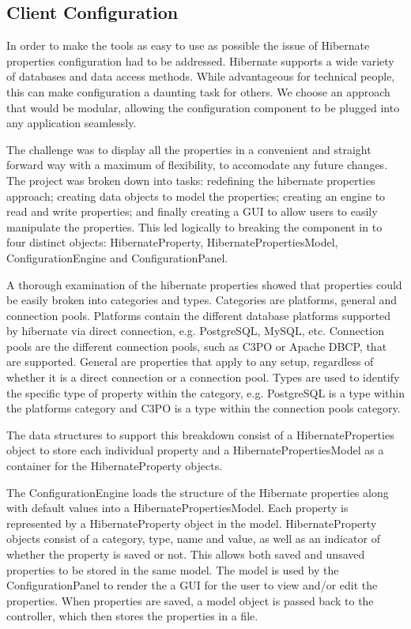 \subsection{Client Configuration}
In order to make the tools as easy to use as possible the issue of Hibernate properties configuration had to be addressed. Hibernate supports a wide variety of databases and data access methods. While advantageous for technical people, this can make configuration a daunting task for others. We choose an approach that would be modular, allowing the configuration component to be plugged into any application seamlessly.  

The challenge was to display all the properties in a convenient and straight forward way with a maximum of flexibility, to accomodate any future changes. The project was broken down into tasks: redefining the hibernate properties approach; creating data objects to model the properties; creating an engine to read and write properties; and finally creating a GUI to allow users to easily manipulate the properties. This led logically to breaking the component in to four distinct objects: HibernateProperty, HibernatePropertiesModel, ConfigurationEngine and ConfigurationPanel. 

A thorough examination of the hibernate properties showed that properties could be easily broken into categories and types. Categories are platforms, general and connection pools. Platforms contain the different database platforms supported by hibernate via direct connection, e.g. PostgreSQL, MySQL, etc. Connection pools are the different connection pools, such as C3PO or Apache DBCP, that are supported. General are properties that apply to any setup, regardless of whether it is a direct connection or a connection pool. Types are used to identify the specific type of property within the category, e.g. PostgreSQL is a type within the platforms category and C3PO is a type within the connection pools category.

The data structures to support this breakdown consist of a HibernateProperties object to store each individual property and a HibernatePropertiesModel as a container for the HibernateProperty objects.


The ConfigurationEngine loads the structure of the Hibernate properties along with default values into a HibernatePropertiesModel. Each property is represented by a HibernateProperty object in the model. HibernateProperty objects consist of a category, type, name and value, as well as an indicator of whether the property is saved or not. This allows both saved and unsaved properties to be stored in the same model. The model is used by the ConfigurationPanel to render the a GUI for the user to view and/or edit the properties. When properties are saved, a model object is passed back to the controller, which then stores the properties in a file.



